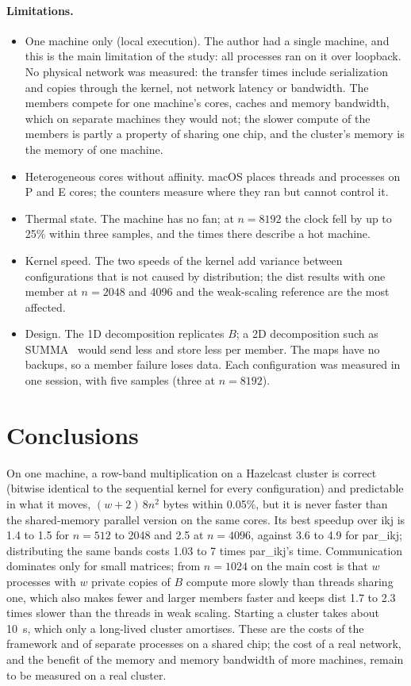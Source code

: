 \documentclass[11pt,a4paper]{article}
\begin{document}
\paragraph{Limitations.}
\begin{itemize}
  \item One machine only (local execution). The author had a single machine,
  and this is the main limitation of the study: all processes ran on it over
  loopback. No
  physical network was measured: the transfer times include serialization and
  copies through the kernel, not network latency or bandwidth. The members
  compete for one machine's cores, caches and memory bandwidth, which on
  separate machines they would not; the slower compute of the members is
  partly a property of sharing one chip, and the cluster's memory is the memory
  of one machine.
  \item Heterogeneous cores without affinity. macOS places threads and processes
  on P and E cores; the counters measure where they ran but cannot control it.
  \item Thermal state. The machine has no fan; at $n=8192$ the clock fell by up
  to 25\% within three samples, and the times there describe a hot machine.
  \item Kernel speed. The two speeds of the kernel add variance between
  configurations that is not caused by distribution; the dist results with one
  member at $n=2048$ and 4096 and the weak-scaling reference are the most
  affected.
  \item Design. The 1D decomposition replicates $B$; a 2D decomposition such as
  SUMMA~\cite{vandegeijn1997} would send less and store less per member. The
  maps have no backups, so a member failure loses data. Each configuration was
  measured in one session, with five samples (three at $n=8192$).
\end{itemize}

\section{Conclusions}
\label{sec:conclusions}

On one machine, a row-band multiplication on a Hazelcast cluster is correct
(bitwise identical to the sequential kernel for every configuration) and
predictable in what it moves, $(w+2)\,8n^2$ bytes within 0.05\%, but it is
never faster than the shared-memory parallel version on the same cores. Its
best speedup over ikj is 1.4 to 1.5 for $n=512$ to 2048 and 2.5 at $n=4096$,
against 3.6 to 4.9 for par\_ikj; distributing the same bands costs 1.03 to 7 times
par\_ikj's time. Communication dominates only for small matrices; from
$n=1024$ on the main cost is that $w$ processes with $w$ private copies of $B$
compute more slowly than threads sharing one, which also makes fewer and
larger members faster and keeps dist 1.7 to 2.3 times slower than the threads
in weak scaling. Starting a cluster takes about 10~s, which only a long-lived cluster
amortises. These are the costs of the framework and of separate processes on a
shared chip; the cost of a real network, and the benefit of the memory and
memory bandwidth of more machines, remain to be measured on a real cluster.
\end{document}
